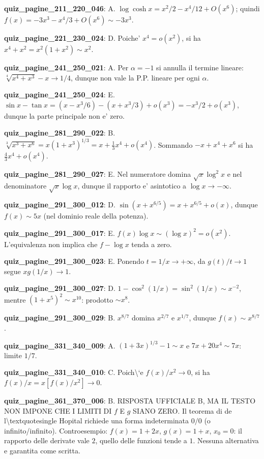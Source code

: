\documentclass[11pt,a4paper]{article}
\newcounter{quiz}
\begin{document}
\noindent\textbf{quiz\_pagine\_211\_220\_046}: A. $\log\cosh x=x^2/2-x^4/12+O(x^6)$; quindi $f(x)=-3x^3-x^4/3+O(x^6)\sim-3x^3$.\par\medskip
\noindent\textbf{quiz\_pagine\_221\_230\_024}: D. Poiche' $x^4=o(x^2)$, si ha $x^4+x^2=x^2(1+x^2)\sim x^2$.\par\medskip
\noindent\textbf{quiz\_pagine\_241\_250\_021}: A. Per $\alpha=-1$ si annulla il termine lineare: $\sqrt[4]{x^4+x^3}-x\to1/4$, dunque non vale la P.P. lineare per ogni $\alpha$.\par\medskip
\noindent\textbf{quiz\_pagine\_241\_250\_024}: E. $\sin x-\tan x=(x-x^3/6)-(x+x^3/3)+o(x^3)=-x^3/2+o(x^3)$, dunque la parte principale non e' zero.\par\medskip
\noindent\textbf{quiz\_pagine\_281\_290\_022}: B. $\sqrt[3]{x^3+x^6}=x(1+x^3)^{1/3}=x+\frac13x^4+o(x^4)$. Sommando $-x+x^4+x^6$ si ha $\frac43x^4+o(x^4)$.\par\medskip
\noindent\textbf{quiz\_pagine\_281\_290\_027}: E. Nel numeratore domina $\sqrt x\log^2x$ e nel denominatore $\sqrt x\log x$, dunque il rapporto e' asintotico a $\log x\to-\infty$.\par\medskip
\noindent\textbf{quiz\_pagine\_291\_300\_012}: D. $\sin(x+x^{6/5})=x+x^{6/5}+o(x)$, dunque $f(x)\sim5x$ (nel dominio reale della potenza).\par\medskip
\noindent\textbf{quiz\_pagine\_291\_300\_017}: E. $f(x)\log x\sim(\log x)^2=o(x^2)$. L'equivalenza non implica che $f-\log x$ tenda a zero.\par\medskip
\noindent\textbf{quiz\_pagine\_291\_300\_023}: E. Ponendo $t=1/x\to+\infty$, da $g(t)/t\to1$ segue $xg(1/x)\to1$.\par\medskip
\noindent\textbf{quiz\_pagine\_291\_300\_027}: D. $1-\cos^2(1/x)=\sin^2(1/x)\sim x^{-2}$, mentre $(1+x^5)^2\sim x^{10}$: prodotto $\sim x^8$.\par\medskip
\noindent\textbf{quiz\_pagine\_291\_300\_029}: B. $x^{8/7}$ domina $x^{2/7}$ e $x^{1/7}$, dunque $f(x)\sim x^{8/7}$.\par\medskip
\noindent\textbf{quiz\_pagine\_331\_340\_009}: A. $(1+3x)^{1/3}-1\sim x$ e $7x+20x^4\sim7x$: limite $1/7$.\par\medskip
\noindent\textbf{quiz\_pagine\_331\_340\_010}: C. Poich\textbackslash{}`e $f(x)/x^2\to0$, si ha $f(x)/x=x[f(x)/x^2]\to0$.\par\medskip
\noindent\textbf{quiz\_pagine\_361\_370\_006}: B. RISPOSTA UFFICIALE B, MA IL TESTO NON IMPONE CHE I LIMITI DI $f$ E $g$ SIANO ZERO. Il teorema di de l\textbackslash{}textquotesingle Hopital richiede una forma indeterminata $0/0$ (o infinito/infinito). Controesempio: $f(x)=1+2x$, $g(x)=1+x$, $x_0=0$: il rapporto delle derivate vale $2$, quello delle funzioni tende a $1$. Nessuna alternativa e garantita come scritta.\par\medskip
\end{document}
